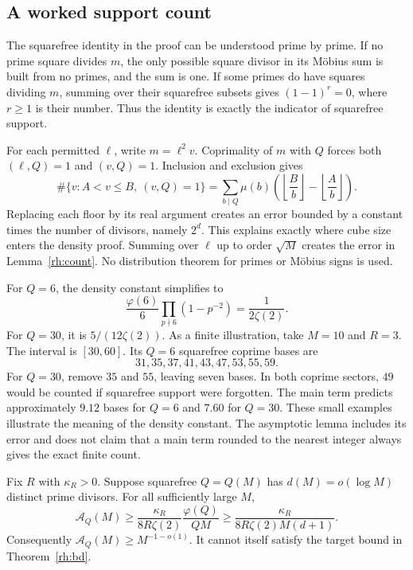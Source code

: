 \subsection{A worked support count}

The squarefree identity in the proof can be understood prime by prime. If no prime square divides \(m\), the only possible square divisor in its Möbius sum is built from no primes, and the sum is one. If some primes do have squares dividing \(m\), summing over their squarefree subsets gives \((1-1)^r=0\), where \(r\ge1\) is their number. Thus the identity is exactly the indicator of squarefree support.

For each permitted \(\ell\), write \(m=\ell^2v\). Coprimality of \(m\) with \(Q\) forces both \((\ell,Q)=1\) and \((v,Q)=1\). Inclusion and exclusion gives
\[
\#\{v:A<v\le B,\ (v,Q)=1\}
=\sum_{b\mid Q}\mu(b)
\left(\left\lfloor\frac B b\right\rfloor-
\left\lfloor\frac A b\right\rfloor\right).
\]
Replacing each floor by its real argument creates an error bounded by a constant times the number of divisors, namely \(2^d\). This explains exactly where cube size enters the density proof. Summing over \(\ell\) up to order \(\sqrt M\) creates the error in Lemma~\ref{rh:count}. No distribution theorem for primes or Möbius signs is used.

For \(Q=6\), the density constant simplifies to
\[
\frac{\varphi(6)}6\prod_{p\nmid6}(1-p^{-2})
=\frac1{2\zeta(2)}.
\]
For \(Q=30\), it is \(5/(12\zeta(2))\). As a finite illustration, take \(M=10\) and \(R=3\). The interval is \([30,60]\). Its \(Q=6\) squarefree coprime bases are
\[
31,35,37,41,43,47,53,55,59.
\]
For \(Q=30\), remove \(35\) and \(55\), leaving seven bases. In both coprime sectors, \(49\) would be counted if squarefree support were forgotten. The main term predicts approximately \(9.12\) bases for \(Q=6\) and \(7.60\) for \(Q=30\). These small examples illustrate the meaning of the density constant. The asymptotic lemma includes its error and does not claim that a main term rounded to the nearest integer always gives the exact finite count.

\begin{theorem}\label{rh:barrier}
Fix \(R\) with \(\kappa_R>0\). Suppose squarefree \(Q=Q(M)\) has \(d(M)=o(\log M)\) distinct prime divisors. For all sufficiently large \(M\),
\begin{equation}\label{rh:barrierbound}
\mathcal A_Q(M)\ge
\frac{\kappa_R}{8R\zeta(2)}
\frac{\varphi(Q)}{QM}
\ge\frac{\kappa_R}{8R\zeta(2)M(d+1)}.
\end{equation}
Consequently \(\mathcal A_Q(M)\ge M^{-1-o(1)}\). It cannot itself satisfy the target bound in Theorem~\ref{rh:bd}.
\end{theorem}

